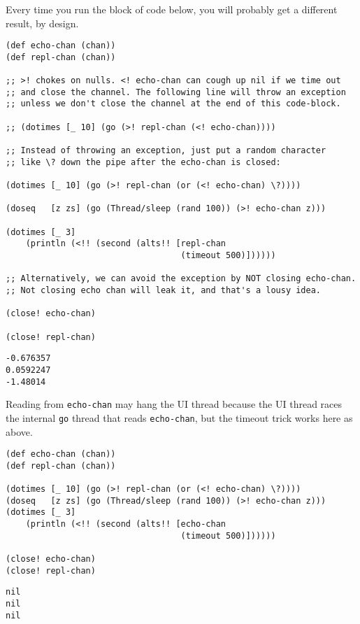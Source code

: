 \documentclass[10pt,oneside,x11names]{article}
\begin{document}
Every time you run the block of code below, you will probably get a different
result, by design.

\begin{verbatim}
(def echo-chan (chan))
(def repl-chan (chan))

;; >! chokes on nulls. <! echo-chan can cough up nil if we time out
;; and close the channel. The following line will throw an exception
;; unless we don't close the channel at the end of this code-block.

;; (dotimes [_ 10] (go (>! repl-chan (<! echo-chan))))

;; Instead of throwing an exception, just put a random character
;; like \? down the pipe after the echo-chan is closed:

(dotimes [_ 10] (go (>! repl-chan (or (<! echo-chan) \?))))

(doseq   [z zs] (go (Thread/sleep (rand 100)) (>! echo-chan z)))

(dotimes [_ 3]
    (println (<!! (second (alts!! [repl-chan
                                   (timeout 500)])))))

;; Alternatively, we can avoid the exception by NOT closing echo-chan.
;; Not closing echo chan will leak it, and that's a lousy idea.

(close! echo-chan)

(close! repl-chan)
\end{verbatim}

\begin{verbatim}
-0.676357
0.0592247
-1.48014
\end{verbatim}


Reading from \texttt{echo-chan} may hang the UI thread because the UI thread
races the internal \texttt{go} thread that reads \texttt{echo-chan}, but the timeout trick
works here as above.

\begin{verbatim}
(def echo-chan (chan))
(def repl-chan (chan))

(dotimes [_ 10] (go (>! repl-chan (or (<! echo-chan) \?))))
(doseq   [z zs] (go (Thread/sleep (rand 100)) (>! echo-chan z)))
(dotimes [_ 3]
    (println (<!! (second (alts!! [echo-chan
                                   (timeout 500)])))))

(close! echo-chan)
(close! repl-chan)
\end{verbatim}

\begin{verbatim}
nil
nil
nil
\end{verbatim}
\end{document}
